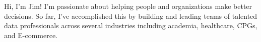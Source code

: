 \begin {cvsummary}

Hi, I'm Jim! I'm passionate about helping people and organizations make better decisions. So far, I've accomplished this by building and leading teams of talented data professionals across several industries including academia, healthcare, CPGs, and E-commerce.

\end {cvsummary}
